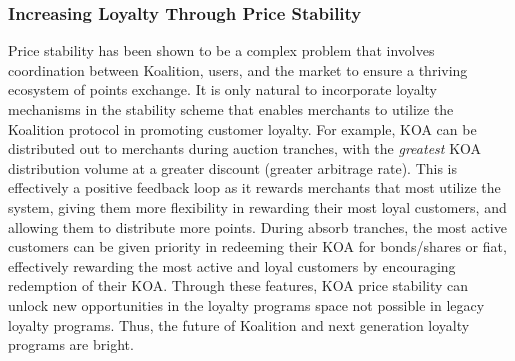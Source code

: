 \subsubsection{Increasing Loyalty Through Price Stability}

Price stability has been shown to be a complex problem that involves coordination between Koalition, users, and the market to ensure a thriving ecosystem of points exchange. It is only natural to incorporate loyalty mechanisms in the stability scheme that enables merchants to utilize the Koalition protocol in promoting customer loyalty. For example, KOA can be distributed out to merchants during auction tranches, with the \textit{greatest} KOA distribution volume at a greater discount (greater arbitrage rate). This is effectively a positive feedback loop as it rewards merchants that most utilize the system, giving them more flexibility in rewarding their most loyal customers, and allowing them to distribute more points. During absorb tranches, the most active customers can be given priority in redeeming their KOA for bonds/shares or fiat, effectively rewarding the most active and loyal customers by encouraging redemption of their KOA. Through these features, KOA price stability can unlock new opportunities in the loyalty programs space not possible in legacy loyalty programs. Thus, the future of Koalition and next generation loyalty programs are bright.